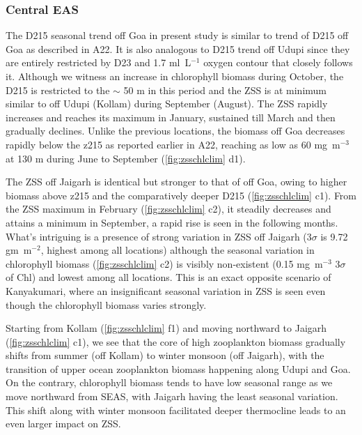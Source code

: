 \documentclass{article}
\begin{document}
		\subsubsection{Central EAS}
		The D215 seasonal trend off Goa in present study is similar to trend of D215 off Goa as described in A22. It is also analogous to D215 trend off Udupi since they are entirely restricted by D23 and 1.7 ml~L$^{-1}$ oxygen contour that closely follows it. Although we witness an increase in chlorophyll biomass during October, the D215 is restricted to the $\sim$ 50 m in this period  and the ZSS is at minimum  similar to off Udupi (Kollam) during September (August). The ZSS rapidly increases and reaches its maximum in January, sustained till March and then gradually declines. Unlike the previous locations, the biomass off Goa decreases rapidly below the z215 as reported earlier in A22, reaching as low as 60 mg~m$^{-3}$ at 130 m during June to September (\cref{fig:zsschlclim} d1).
	 
		The ZSS off Jaigarh is identical but stronger to that of off Goa, owing to higher biomass above z215 and the comparatively deeper D215 (\cref{fig:zsschlclim} c1). From the ZSS maximum in February (\cref{fig:zsschlclim} c2), it steadily decreases and attains a minimum in September, a rapid rise is seen in the following months. What's intriguing is a presence of strong variation in ZSS off Jaigarh (3$\sigma$ is 9.72 gm~m$^{-2}$, highest among all locations) although the seasonal variation in chlorophyll biomass (\cref{fig:zsschlclim} c2) is visibly non-existent (0.15 mg~m$^{-3}$ 3$\sigma$ of Chl) and lowest among all locations. This is an exact opposite scenario of Kanyakumari, where an insignificant seasonal variation in ZSS is seen even though the chlorophyll biomass varies strongly. 
		
		Starting from Kollam (\cref{fig:zsschlclim} f1) and moving northward to Jaigarh (\cref{fig:zsschlclim} c1), we see that the core of high zooplankton biomass gradually shifts from summer (off Kollam) to winter monsoon (off Jaigarh), with the transition of upper ocean zooplankton biomass happening along Udupi and Goa. On the contrary, chlorophyll biomass tends to have low seasonal range as we move northward from SEAS, with Jaigarh having the least seasonal variation. This shift along with winter monsoon facilitated deeper thermocline leads to an even larger impact on ZSS.
	 
\end{document}
